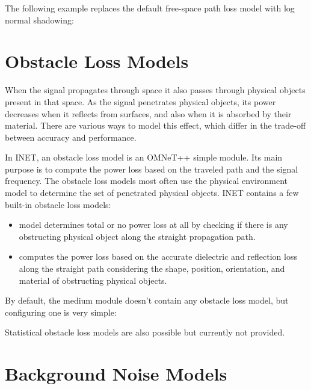 The following example replaces the default free-space path loss model with
log normal shadowing:


\section{Obstacle Loss Models}
\label{sec:medium:obstacle-loss-models}

When the signal propagates through space it also passes through physical
objects present in that space. As the signal penetrates physical objects,
its power decreases when it reflects from surfaces, and also when it is
absorbed by their material. There are various ways to model this effect,
which differ in the trade-off between accuracy and performance.

In INET, an obstacle loss model is an OMNeT++ simple module. Its main
purpose is to compute the power loss based on the traveled path and the
signal frequency. The obstacle loss models most often use the physical
environment model to determine the set of penetrated physical objects.
INET contains a few built-in obstacle loss models:

\begin{itemize}
        \item {} model determines total or no power loss at all by checking if there is any obstructing physical object along the straight propagation path.
        \item {} computes the power loss based on the accurate dielectric and reflection loss along the straight path considering the shape, position, orientation, and material of obstructing physical objects.
\end{itemize}

By default, the medium module doesn't contain any obstacle loss model, but
configuring one is very simple:


Statistical obstacle loss models are also possible but currently not provided.

\section{Background Noise Models}
\label{sec:medium:background-noise-models}

